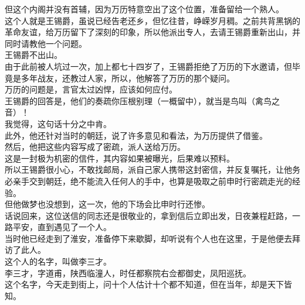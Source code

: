\begin{multicols}{\theparacolNo}
但这个内阁并没有首辅，因为万历特意空出了这个位置，准备留给一个熟人。\\

这个人就是王锡爵，虽说已经告老还乡，但忆往昔，峥嵘岁月稠。之前共背黑锅的革命友谊，给万历留下了深刻的印象，所以他派出专人，去请王锡爵重新出山，并同时请教他一个问题。\\

王锡爵不出山。\\

由于此前被人坑过一次，加上都七十四岁了，王锡爵拒绝了万历的下水邀请，但毕竟是多年战友，还教过人家，所以，他解答了万历的那个疑问。\\

万历的问题是，言官太过凶悍，应该如何应付。\\

王锡爵的回答是，他们的奏疏你压根别理（一概留中），就当是鸟叫（禽鸟之音）！\\

我觉得，这句话十分之中肯。\\

此外，他还针对当时的朝廷，说了许多意见和看法，为万历提供了借鉴。\\

然后，他把这些内容写成了密疏，派人送给万历。\\

这是一封极为机密的信件，其内容如果被曝光，后果难以预料。\\

所以王锡爵很小心，不敢找邮局，派自己家人携带这封密信，并反复嘱托，让他务必亲手交到朝廷，绝不能流入任何人的手中，也算是吸取之前申时行密疏走光的经验。\\

但他做梦也没想到，这一次，他的下场会比申时行还惨。\\

话说回来，这位送信的同志还是很敬业的，拿到信后立即出发，日夜兼程赶路，一路平安，直到遇见了一个人。\\

当时他已经走到了淮安，准备停下来歇脚，却听说有个人也在这里，于是他便去拜访了此人。\\

这个人的名字，叫做李三才。\\

李三才，字道甫，陕西临潼人，时任都察院右佥都御史，凤阳巡抚。\\

这个名字，今天走到街上，问十个人估计十个都不知道，但在当年，却是天下皆知。\\


\end{multicols}
